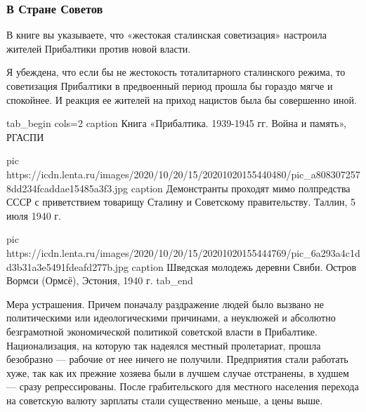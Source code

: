  
 
 
 
 
\clearpage
\subsubsection{В Стране Советов}

В книге вы указываете, что «жестокая сталинская советизация» настроила жителей
Прибалтики против новой власти.

Я убеждена, что если бы не жестокость тоталитарного сталинского режима, то
советизация Прибалтики в предвоенный период прошла бы гораздо мягче и
спокойнее. И реакция ее жителей на приход нацистов была бы совершенно иной.

\ifcmt
tab_begin cols=2
	caption Книга «Прибалтика. 1939-1945 гг. Война и память», РГАСПИ

	pic https://icdn.lenta.ru/images/2020/10/20/15/20201020155440480/pic_a8083072578dd234fcaddae15485a3f3.jpg
	caption Демонстранты проходят мимо полпредства СССР с приветствием товарищу Сталину и Советскому правительству. Таллин, 5 июля 1940 г. 

	pic https://icdn.lenta.ru/images/2020/10/20/15/20201020155444769/pic_6a293a4c1dd3b31a3e5491fdeafd277b.jpg
	caption Шведская молодежь деревни Свиби. Остров Вормси (Ормсё), Эстония, 1940 г.
tab_end
\fi


Мера устрашения. Причем поначалу раздражение людей было вызвано не
политическими или идеологическими причинами, а неуклюжей и абсолютно
безграмотной экономической политикой советской власти в Прибалтике.
Национализация, на которую так надеялся местный пролетариат, прошла безобразно
— рабочие от нее ничего не получили. Предприятия стали работать хуже, так как
их прежние хозяева были в лучшем случае отстранены, в худшем — сразу
репрессированы. После грабительского для местного населения перехода на
советскую валюту зарплаты стали существенно меньше, а цены выше.

